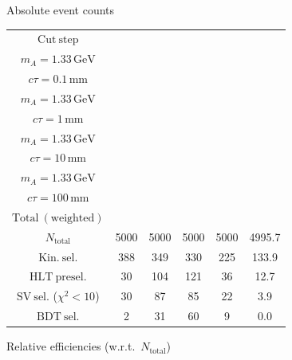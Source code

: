 \documentclass[10pt,a4paper]{article}
\renewcommand{\arraystretch}{1.4}
\begin{document}
{\footnotesize\setlength{\tabcolsep}{4pt}\renewcommand{\arraystretch}{1.05}%
\vspace{12pt}

Absolute event counts

\begin{tabular}{cccccc}
\toprule
$\mathrm{Cut\ step}$ & \shortstack{$m_{\pi}=4\,\mathrm{GeV}$\\$m_{A}=1.33\,\mathrm{GeV}$\\$c\tau=0.1\,\mathrm{mm}$} & \shortstack{$m_{\pi}=4\,\mathrm{GeV}$\\$m_{A}=1.33\,\mathrm{GeV}$\\$c\tau=1\,\mathrm{mm}$} & \shortstack{$m_{\pi}=4\,\mathrm{GeV}$\\$m_{A}=1.33\,\mathrm{GeV}$\\$c\tau=10\,\mathrm{mm}$} & \shortstack{$m_{\pi}=4\,\mathrm{GeV}$\\$m_{A}=1.33\,\mathrm{GeV}$\\$c\tau=100\,\mathrm{mm}$} & \shortstack{$\mathrm{QCD}$\\$\mathrm{Total\ (weighted)}$} \\
\midrule
$N_{\mathrm{total}}$ & 5000 & 5000 & 5000 & 5000 & 4995.7\\
$\mathrm{Kin.\ sel.}$ & 388 & 349 & 330 & 225 & 133.9\\
$\mathrm{HLT\ presel.}$ & 30 & 104 & 121 & 36 & 12.7\\
$\mathrm{SV\ sel.}$ ($\chi^2{<}10$) & 30 & 87 & 85 & 22 & 3.9\\
$\mathrm{BDT\ sel.}$ & 2 & 31 & 60 & 9 & 0.0\\
\bottomrule
\end{tabular}

\vspace{18pt}

Relative efficiencies (w.r.t.\ $N_{\mathrm{total}}$)

}
\end{document}
